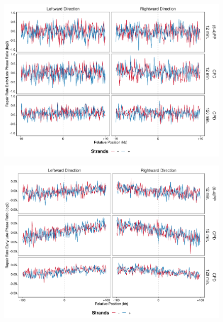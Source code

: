 \begin{figure}[H]
\begin{center}
\includegraphics[width=\textwidth]{Chapters/7_appendix/figures/supfig69}
\caption[]{}
\label{supfig:}
\end{center}
\end{figure}

\begin{figure}[H]
\begin{center}
\includegraphics[width=\textwidth]{Chapters/7_appendix/figures/supfig70}
\caption[]{}
\label{supfig:}
\end{center}
\end{figure}

